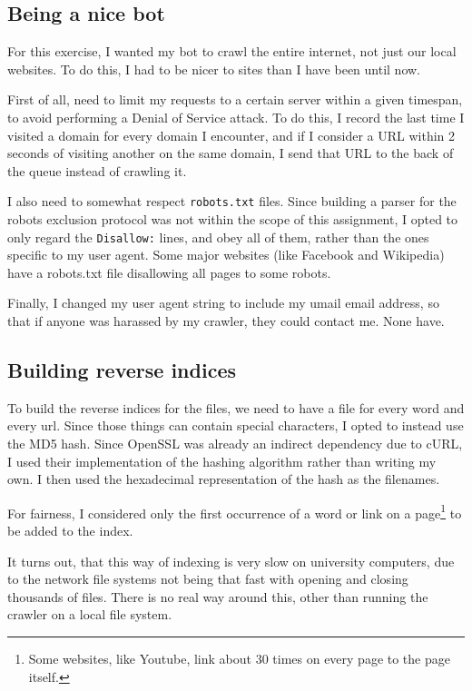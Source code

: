 \documentclass[12pt,a4paper]{article}
\begin{document}
\subsection{Being a nice bot}

For this exercise, I wanted my bot to crawl the entire internet, not just our local websites. To do this, I had to be nicer to sites than I have been until now.

First of all, need to limit my requests to a certain server within a given timespan, to avoid performing a Denial of Service attack. To do this, I record the last time I visited a domain for every domain I encounter, and if I consider a URL within 2 seconds of visiting another on the same domain, I send that URL to the back of the queue instead of crawling it.

I also need to somewhat respect \texttt{robots.txt} files. Since building a parser for the robots exclusion protocol was not within the scope of this assignment, I opted to only regard the \texttt{Disallow:} lines, and obey all of them, rather than the ones specific to my user agent. Some major websites (like Facebook and Wikipedia) have a robots.txt file disallowing all pages to some robots.

Finally, I changed my user agent string to include my umail email address, so that if anyone was harassed by my crawler, they could contact me. None have.

\subsection{Building reverse indices}

To build the reverse indices for the files, we need to have a file for every word and every url. Since those things can contain special characters, I opted to instead use the MD5 hash. Since OpenSSL was already an indirect dependency due to cURL, I used their implementation of the hashing algorithm rather than writing my own. I then used the hexadecimal representation of the hash as the filenames.

For fairness, I considered only the first occurrence of a word or link on a page\footnote{Some websites, like Youtube, link about 30 times on every page to the page itself.} to be added to the index.

It turns out, that this way of indexing is very slow on university computers, due to the network file systems not being that fast with opening and closing thousands of files. There is no real way around this, other than running the crawler on a local file system.
\end{document}
